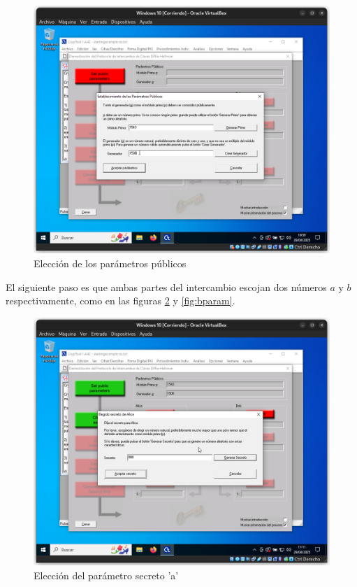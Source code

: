 \begin{figure}[H]
    \includegraphics[width=\textwidth]{D&H-2.png}
    \caption{Elección de los parámetros públicos}
    \label{fig:publicparams}
\end{figure}

El siguiente paso es que ambas partes del intercambio escojan dos números $a$ y $b$ respectivamente, como en las figuras \ref{fig:aparam} y \ref{fig:bparam}.

\begin{figure}[H]
    \includegraphics[width=\textwidth]{D&H-3.png}
    \caption{Elección del parámetro secreto 'a'}
    \label{fig:aparam}
\end{figure}


